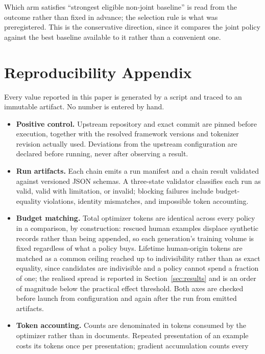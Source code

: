 Which arm satisfies ``strongest eligible non-joint baseline'' is read from the
outcome rather than fixed in advance; the selection rule is what was preregistered.
This is the conservative direction, since it compares the joint policy against the
best baseline available to it rather than a convenient one.

\section{Reproducibility Appendix}
\label{app:reproducibility}

Every value reported in this paper is generated by a script and traced to an
immutable artifact. No number is entered by hand.

\begin{itemize}
  \item \textbf{Positive control.} Upstream repository and exact commit are
    pinned before execution, together with the resolved framework versions and
    tokenizer revision actually used. Deviations from the upstream configuration
    are declared before running, never after observing a result.
  \item \textbf{Run artifacts.} Each chain emits a run manifest and a chain
    result validated against versioned JSON schemas. A three-state validator
    classifies each run as valid, valid with limitation, or invalid; blocking
    failures include budget-equality violations, identity mismatches, and
    impossible token accounting.
  \item \textbf{Budget matching.} Total optimizer tokens are identical across every
    policy in a comparison, by construction: rescued human examples displace
    synthetic records rather than being appended, so each generation's training
    volume is fixed regardless of what a policy buys. Lifetime human-origin tokens
    are matched as a common ceiling reached up to indivisibility rather than as
    exact equality, since candidates are indivisible and a policy cannot spend a
    fraction of one; the realised spread is reported in Section~\ref{sec:results}
    and is an order of magnitude below the practical effect threshold. Both axes
    are checked before launch from configuration and again after the run from
    emitted artifacts.
  \item \textbf{Token accounting.} Counts are denominated in tokens consumed by the
    optimizer rather than in documents. Repeated presentation of an example costs
    its tokens once per presentation; gradient accumulation counts every

\end{itemize}
